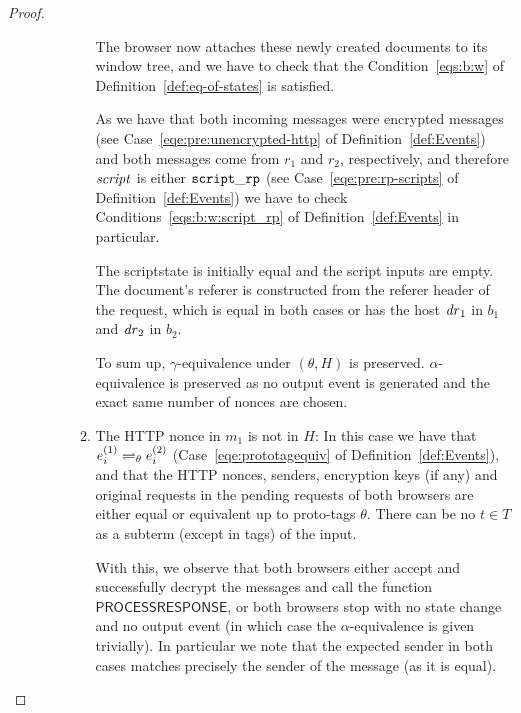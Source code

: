 \begin{theorem}
\begin{proof}
\begin{description}
\begin{enumerate}[I.]
\begin{enumerate}
              The browser now attaches these newly created documents to its
              window tree, and we have to check that the
              Condition~\ref{eqs:b:w} of Definition~\ref{def:eq-of-states}
              is satisfied.
      
              As we have that both incoming messages were encrypted messages
              (see Case~\ref{eqe:pre:unencrypted-http} of
              Definition~\ref{def:Events}) and both messages come from
              $r_1$ and $r_2$, respectively, and therefore $\mathit{script}$ is
              either $\mathtt{script\_rp}$ (see
              Case~\ref{eqe:pre:rp-scripts} of
              Definition~\ref{def:Events}) we have to check
              Conditions~\ref{eqs:b:w:script_rp} of
              Definition~\ref{def:Events} in particular.
      
              The scriptstate is initially equal and the script inputs are empty. The document's
              referer is constructed from the referer header of the request,
              which is equal in both cases or has the host $\mathit{dr}_1$ in
              $b_1$ and $\mathit{dr}_2$ in $b_2$.
      
              To sum up, $\gamma$-equivalence under $(\theta, H)$ is
              preserved. $\alpha$-equivalence is preserved as no output
              event is generated and the exact same number of nonces are
              chosen.
      
            
            \item The HTTP nonce in $m_1$ is not in $H$: In this case we
              have that $e_i^{(1)} \rightleftharpoons_{\theta} e_i^{(2)}$
              (Case~\ref{eqe:prototagequiv} of
              Definition~\ref{def:Events}), and that the HTTP nonces,
              senders, encryption keys (if any) and original requests in the
              pending requests of both browsers are either equal or
              equivalent up to proto-tags $\theta$. There can be no
              $t \in T$ as a subterm (except in tags) of the input.
      
              With this, we observe that both browsers either accept and
              successfully decrypt the messages and call the function
              $\mathsf{PROCESSRESPONSE}$, or both browsers stop with no
              state change and no output event (in which case the
              $\alpha$-equivalence is given trivially). In particular we
              note that the expected sender in both cases matches precisely
              the sender of the message (as it is equal).
      

\end{enumerate}
\end{enumerate}
\end{description}
\end{proof}
\end{theorem}
